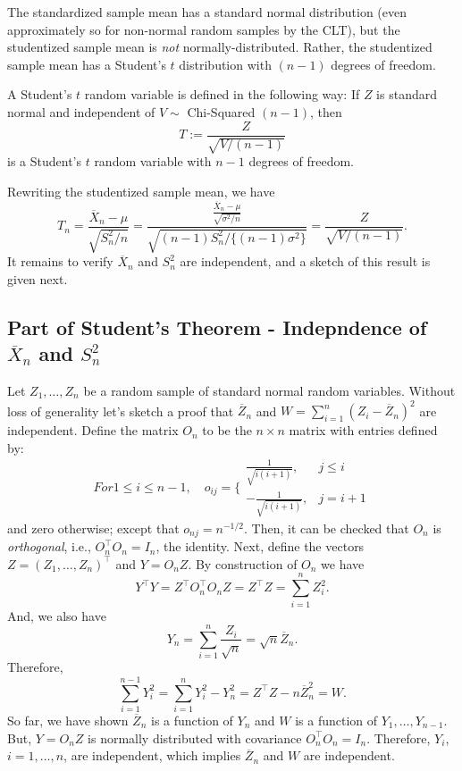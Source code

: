 \documentclass[
]{book}
\begin{document}
The standardized sample mean has a standard normal distribution (even approximately so for non-normal random samples by the CLT), but the studentized sample mean is \emph{not} normally-distributed. Rather, the studentized sample mean has a Student's \(t\) distribution with \((n-1)\) degrees of freedom.

A Student's \(t\) random variable is defined in the following way: If \(Z\) is standard normal and independent of \(V \sim\) Chi-Squared \((n-1)\), then
\[T:=\frac{Z}{\sqrt{V/(n-1)}}\]
is a Student's \(t\) random variable with \(n-1\) degrees of freedom.

Rewriting the studentized sample mean, we have
\[T_n = \frac{\overline X_n - \mu}{\sqrt{S_n^2 / n}} = \frac{\frac{\overline X_n - \mu}{\sqrt{\sigma^2 / n}}}{\sqrt{(n-1)S_n^2/\{(n-1)\sigma^2\}}} = \frac{Z}{\sqrt{V/(n-1)}}.\]
It remains to verify \(\overline X_n\) and \(S_n^2\) are independent, and a sketch of this result is given next.

\hypertarget{part-of-students-theorem---indepndence-of-overline-x_n-and-s_n2}{%
\subsection{\texorpdfstring{Part of Student's Theorem - Indepndence of \(\overline X_n\) and \(S_n^2\)}{Part of Student's Theorem - Indepndence of \textbackslash overline X\_n and S\_n\^{}2}}\label{part-of-students-theorem---indepndence-of-overline-x_n-and-s_n2}}

Let \(Z_1, \ldots, Z_n\) be a random sample of standard normal random variables. Without loss of generality let's sketch a proof that \(\overline Z_n\) and \(W = \sum_{i=1}^n (Z_i - \overline Z_n)^2\) are independent. Define the matrix \(O_n\) to be the \(n\times n\) matrix with entries defined by:
\[For 1 \leq i \leq n-1, \quad o_{ij} = \Bigg\{ \begin{matrix} \frac{1}{\sqrt{i(i+1)}}, &j\leq i \\
-\frac{1}{\sqrt{i(i+1)}}, &j= i+1 
\end{matrix}\]
and zero otherwise; except that \(o_{nj} = n^{-1/2}\). Then, it can be checked that \(O_n\) is \emph{orthogonal}, i.e., \(O_n^\top O_n = I_n\), the identity. Next, define the vectors \(Z = (Z_1, \ldots, Z_n)^\top\) and \(Y = O_n Z\). By construction of \(O_n\) we have
\[Y^\top Y = Z^\top O_n^\top O_n Z = Z^\top Z = \sum_{i=1}^n Z_i^2.\]
And, we also have
\[Y_n = \sum_{i=1}^n \frac{Z_i}{\sqrt{n}} = \sqrt{n} \overline Z_n.\]
Therefore,
\[\sum_{i=1}^{n-1}Y_i^2 = \sum_{i=1}^{n}Y_i^2 - Y_n^2 = Z^\top Z - n\overline Z_n^2 = W.\]
So far, we have shown \(\overline Z_n\) is a function of \(Y_n\) and \(W\) is a function of \(Y_1, \ldots, Y_{n-1}\). But, \(Y = O_n Z\) is normally distributed with covariance \(O_n^\top O_n = I_n\). Therefore, \(Y_i\), \(i=1, \ldots, n\), are independent, which implies \(\overline Z_n\) and \(W\) are independent.
\end{document}
